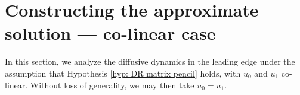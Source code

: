 \documentclass[11pt]{article}
\numberwithin{equation}{section}
\numberwithin{prop}{section}
\begin{document}
%
%

\section{Constructing the approximate solution --- co-linear case}\label{s: colinear}
In this section, we analyze the diffusive dynamics in the leading edge under the assumption that Hypothesis \ref{hyp: DR matrix pencil} holds, with $u_0$ and $u_1$ co-linear. Without loss of generality, we may then take $u_0 = u_1$. 
\end{document}

